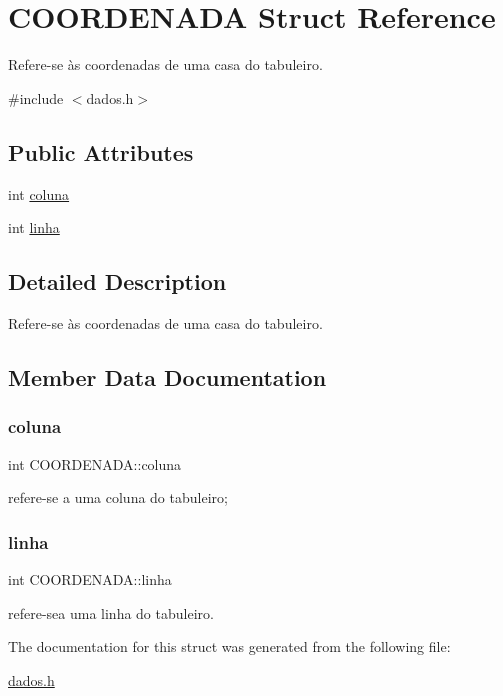 \hypertarget{structCOORDENADA}{}\section{C\+O\+O\+R\+D\+E\+N\+A\+DA Struct Reference}
\label{structCOORDENADA}


Refere-\/se às coordenadas de uma casa do tabuleiro.  




{\ttfamily \#include $<$dados.\+h$>$}

\subsection*{Public Attributes}
\begin{DoxyCompactItemize}
\item 
int \hyperlink{structCOORDENADA_adfbc8d4856ce807139fdf62e00aed29a}{coluna}
\item 
int \hyperlink{structCOORDENADA_aefe14bcc5a066ac3b21500cc3d28c06f}{linha}
\end{DoxyCompactItemize}


\subsection{Detailed Description}
Refere-\/se às coordenadas de uma casa do tabuleiro. 

\subsection{Member Data Documentation}
\mbox{\label{structCOORDENADA_adfbc8d4856ce807139fdf62e00aed29a}} 
\subsubsection{\texorpdfstring{coluna}{coluna}}
{\footnotesize\ttfamily int C\+O\+O\+R\+D\+E\+N\+A\+D\+A\+::coluna}

refere-\/se a uma coluna do tabuleiro; \mbox{\label{structCOORDENADA_aefe14bcc5a066ac3b21500cc3d28c06f}} 
\subsubsection{\texorpdfstring{linha}{linha}}
{\footnotesize\ttfamily int C\+O\+O\+R\+D\+E\+N\+A\+D\+A\+::linha}

refere-\/sea uma linha do tabuleiro. 

The documentation for this struct was generated from the following file\+:\begin{DoxyCompactItemize}
\item 
\hyperlink{dados_8h}{dados.\+h}\end{DoxyCompactItemize}

